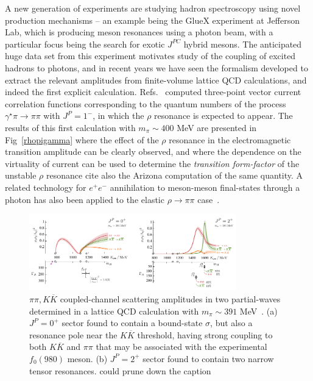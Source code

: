 {A new generation of experiments are studying hadron spectroscopy using novel production mechanisms -- an example being the GlueX experiment at Jefferson Lab, which is producing meson resonances using a photon beam, with a particular focus being the search for exotic $J^{PC}$ hybrid mesons. The anticipated huge data set from this experiment motivates study of the coupling of excited hadrons to photons, and in recent years we have seen the formalism developed to extract the relevant amplitudes from finite-volume lattice QCD calculations, and indeed the first explicit calculation. Refs.~\cite{Briceno:2015dca,Briceno:2016kkp} computed three-point vector current correlation functions corresponding to the quantum numbers of the process $\gamma^\star \pi \to \pi \pi$ with $J^P=1^-$, in which the $\rho$ resonance is expected to appear. The results of this first calculation with $m_\pi \sim 400$ MeV are presented in Fig~\ref{rhopigamma} where the effect of the $\rho$ resonance in the electromagnetic transition amplitude can be clearly observed, and where the dependence on the virtuality of current can be used to determine the \emph{transition form-factor} of the unstable $\rho$ resonance {\color{red} cite also the Arizona computation of the same quantity}. A related technology for $e^+ e^-$ annihilation to meson-meson final-states through a photon has also been applied to the elastic $\rho \to \pi\pi$ case~\cite{Feng:2014gba}.

 
\begin{figure}
\includegraphics[width=0.8\textwidth]{dudek/f0f2}
\caption{$\pi\pi, K\overline{K}$ coupled-channel scattering amplitudes in two partial-waves determined in a lattice QCD calculation with $m_\pi \sim 391$ MeV~\cite{Briceno:2017qmb}. (a) $J^P=0^+$ sector found to contain a bound-state $\sigma$, but also a resonance pole near the $K\overline{K}$ threshold, having strong coupling to both $K\overline{K}$ and $\pi\pi$ that may be associated with the experimental $f_0(980)$ meson. (b) $J^P=2^+$ sector found to contain two narrow tensor resonances. {\color{red} could prune down the caption}}
\label{f0f2}
\end{figure}


}
